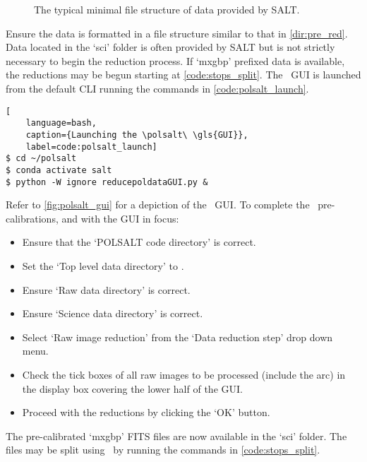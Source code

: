 \begin{figure}[h!]
    \centering
    \begin{minipage}{8cm}
    \end{minipage}
    \caption{The typical minimal file structure of data provided by \gls{SALT}.}
    \label{dir:pre_red}
\end{figure}

Ensure the data is formatted in a file structure similar to that in \autoref{dir:pre_red}. Data located in the `sci' folder is often provided by \gls{SALT} but is not strictly necessary to begin the reduction process. If `mxgbp' prefixed data is available, the reductions may be begun starting at \autoref{code:stops_split}. The \polsalt\ \gls{GUI} is launched from the default \gls{CLI} running the commands in \autoref{code:polsalt_launch}.

\begin{lstlisting}[
    language=bash,
    caption={Launching the \polsalt\ \gls{GUI}},
    label=code:polsalt_launch]
$ cd ~/polsalt
$ conda activate salt
$ python -W ignore reducepoldataGUI.py &
\end{lstlisting}

Refer to \autoref{fig:polsalt_gui} for a depiction of the \polsalt\ \gls{GUI}. To complete the \polsalt\ pre-calibrations, and with the \gls{GUI} in focus:
\begin{itemize}
    \item Ensure that the `POLSALT code directory' is correct.
    \item Set the `Top level data directory' to \obsdate.
    \item Ensure `Raw data directory' is correct.
    \item Ensure `Science data directory' is correct.
    \item Select `Raw image reduction' from the `Data reduction step' drop down menu.
    \item Check the tick boxes of all raw images to be processed (include the arc) in the display box covering the lower half of the \gls{GUI}.
    \item Proceed with the reductions by clicking the `OK' button.
\end{itemize}

The pre-calibrated `mxgbp' \gls{FITS} files are now available in the `sci' folder. The files may be split using \stops\ by running the commands in \autoref{code:stops_split}.

